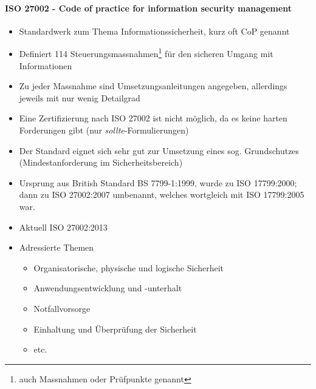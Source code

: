 \documentclass[10pt,a4paper]{article}
\begin{document}
\paragraph*{ISO 27002 - Code of practice for information security management}\label{para:ISO 27002}
\begin{itemize}[noitemsep,topsep=0pt,leftmargin=*]
    \item Standardwerk zum Thema Informationssicherheit, kurz oft CoP genannt
    \item Definiert 114 Steuerungsmassnahmen\footnote{auch Massnahmen oder Prüfpunkte genannt} für den sicheren Umgang mit Informationen
    \item Zu jeder Massnahme sind Umsetzungsanleitungen angegeben, allerdings jeweils mit nur wenig Detailgrad
    \item Eine Zertifizierung nach ISO 27002 ist nicht möglich, da es keine harten Forderungen gibt (nur \textsl{sollte}-Formulierungen)
    \item Der Standard eignet sich sehr gut zur Umsetzung eines sog. Grundschutzes (Mindestanforderung im Sicherheitsbereich)
    \item Ursprung aus British Standard BS 7799-1:1999, wurde zu ISO 17799:2000; dann zu ISO 27002:2007 umbenannt, welches wortgleich mit ISO 17799:2005 war.
    \item Aktuell ISO 27002:2013
    \item Adressierte Themen
    \begin{itemize}[noitemsep,topsep=0pt,leftmargin=*]
        \item Organisatorische, physische und logische Sicherheit
        \item Anwendungsentwicklung und -unterhalt
        \item Notfallvorsorge
        \item Einhaltung und Überprüfung der Sicherheit
        \item etc.
    \end{itemize}
\end{itemize}
\end{document}

